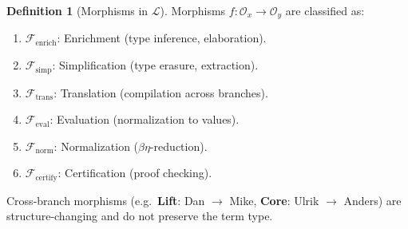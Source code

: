\documentclass{article}
\theoremstyle{definition}
\newtheorem{definition}{Definition}[section]
\theoremstyle{plain}
\begin{document}
\begin{table}[ht]
\centering
{}
\caption{The language lattice: filtration indices and constructor counts.
Note the split at $p=2$ (Christine/Per), the four sublanguages of Urs at $p=4$ (Homotopy, SupSmth, DiffK, Urs), and the separate branch indices
for Dan, Mike, and Ulrik.}
\end{table}

\newpage

\begin{definition}[Morphisms in $\mathcal{L}$]
Morphisms $f : \mathcal{O}_x \to \mathcal{O}_y$ are classified as:
\begin{enumerate}
    \item $\mathcal{F}_{\mathrm{enrich}}$: Enrichment (type inference, elaboration).
    \item $\mathcal{F}_{\mathrm{simp}}$: Simplification (type erasure, extraction).
    \item $\mathcal{F}_{\mathrm{trans}}$: Translation (compilation across branches).
    \item $\mathcal{F}_{\mathrm{eval}}$: Evaluation (normalization to values).
    \item $\mathcal{F}_{\mathrm{norm}}$: Normalization ($\beta\eta$-reduction).
    \item $\mathcal{F}_{\mathrm{certify}}$: Certification (proof checking).
\end{enumerate}
Cross-branch morphisms (e.g.\ \textbf{Lift}: Dan $\to$ Mike, \textbf{Core}:
Ulrik $\to$ Anders) are structure-changing and do not preserve the term type.
\end{definition}
\end{document}
